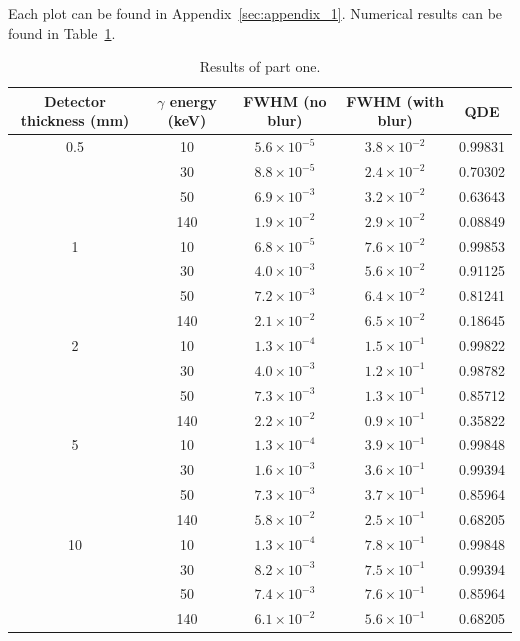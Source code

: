 \documentclass[a4paper]{article}
\begin{document}
Each plot can be found in Appendix~\ref{sec:appendix_1}. Numerical results can be found in Table~\ref{tab:part_one}.

\begin{table}
  \centering
  \begin{tabular}{|c|c|c|c|c|}
   \hline
   Detector thickness (mm) & $\gamma$ energy (keV) & FWHM (no blur) & FWHM (with blur) & QDE \\
   \hline
   0.5 & 10 & $5.6 \times 10^{-5}$ & $3.8 \times 10^{-2}$ & 0.99831 \\
   \hline
    & 30 & $8.8 \times 10^{-5}$ & $2.4 \times 10^{-2}$ & 0.70302 \\
    \hline
    & 50 & $6.9 \times 10^{-3}$ & $3.2 \times 10^{-2}$ & 0.63643 \\
    \hline
    & 140 & $1.9 \times 10^{-2}$ & $2.9 \times 10^{-2}$ & 0.08849 \\
    \hline
   1 & 10 & $6.8 \times 10^{-5}$ & $7.6 \times 10^{-2}$ & 0.99853\\
   \hline
    & 30 & $4.0 \times 10^{-3}$ & $5.6 \times 10^{-2}$ & 0.91125\\
    \hline
    & 50 & $7.2 \times 10^{-3}$ & $6.4 \times 10^{-2}$ & 0.81241\\
    \hline
    & 140 & $2.1 \times 10^{-2}$ & $6.5 \times 10^{-2}$ & 0.18645\\
    \hline
   2 & 10 & $1.3 \times 10^{-4}$ & $1.5 \times 10^{-1}$ & 0.99822\\
   \hline
    & 30 & $4.0 \times 10^{-3}$ & $1.2 \times 10^{-1}$ & 0.98782\\
    \hline
    & 50 & $7.3 \times 10^{-3}$ & $1.3 \times 10^{-1}$ & 0.85712\\
    \hline
    & 140 & $2.2 \times 10^{-2}$ & $0.9 \times 10^{-1}$  & 0.35822\\
    \hline
   5 & 10 & $1.3 \times 10^{-4}$ & $3.9 \times 10^{-1}$ & 0.99848\\
   \hline
    & 30 & $1.6 \times 10^{-3}$ & $3.6 \times 10^{-1}$ & 0.99394\\
    \hline
    & 50 & $7.3 \times 10^{-3}$ & $3.7 \times 10^{-1}$ & 0.85964\\
    \hline
    & 140 & $5.8 \times 10^{-2}$ & $2.5 \times 10^{-1}$ & 0.68205\\
    \hline
   10 & 10 & $1.3 \times 10^{-4}$ & $7.8 \times 10^{-1}$ & 0.99848\\
   \hline
    & 30 & $8.2 \times 10^{-3}$ & $7.5 \times 10^{-1}$ & 0.99394\\
    \hline
    & 50 & $7.4 \times 10^{-3}$ & $7.6 \times 10^{-1}$ & 0.85964\\
    \hline
    & 140 & $6.1 \times 10^{-2}$ & $5.6 \times 10^{-1}$ & 0.68205\\
    \hline
  \end{tabular}
  \caption{Results of part one.}
  \label{tab:part_one}
\end{table}
\end{document}
